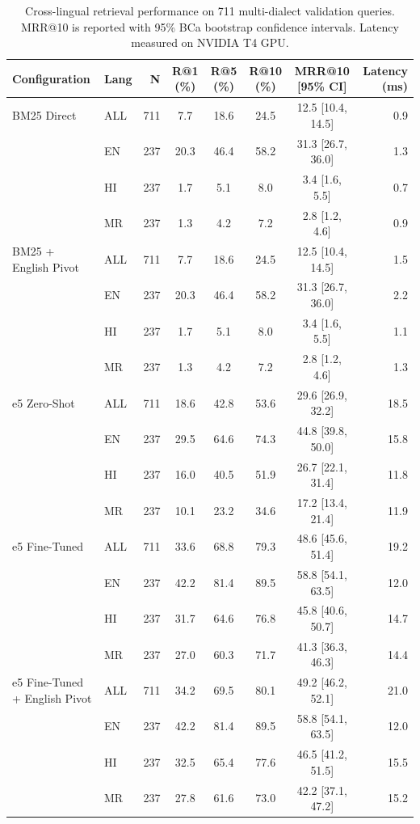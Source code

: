 \begin{table}[t]
\centering
\caption{Cross-lingual retrieval performance on 711 multi-dialect validation queries. MRR@10 is reported with 95\% BCa bootstrap confidence intervals. Latency measured on NVIDIA T4 GPU.}
\label{tab:retrieval_benchmark}
\small
\begin{tabular}{llrccccr}
\toprule
\textbf{Configuration} & \textbf{Lang} & \textbf{N} & \textbf{R@1 (\%)} & \textbf{R@5 (\%)} & \textbf{R@10 (\%)} & \textbf{MRR@10 [95\% CI]} & \textbf{Latency (ms)} \\
\midrule
BM25 Direct & ALL & 711 & 7.7 & 18.6 & 24.5 & 12.5 [10.4, 14.5] & 0.9 \\
 & EN & 237 & 20.3 & 46.4 & 58.2 & 31.3 [26.7, 36.0] & 1.3 \\
 & HI & 237 & 1.7 & 5.1 & 8.0 & 3.4 [1.6, 5.5] & 0.7 \\
 & MR & 237 & 1.3 & 4.2 & 7.2 & 2.8 [1.2, 4.6] & 0.9 \\
\midrule
BM25 + English Pivot & ALL & 711 & 7.7 & 18.6 & 24.5 & 12.5 [10.4, 14.5] & 1.5 \\
 & EN & 237 & 20.3 & 46.4 & 58.2 & 31.3 [26.7, 36.0] & 2.2 \\
 & HI & 237 & 1.7 & 5.1 & 8.0 & 3.4 [1.6, 5.5] & 1.1 \\
 & MR & 237 & 1.3 & 4.2 & 7.2 & 2.8 [1.2, 4.6] & 1.3 \\
\midrule
e5 Zero-Shot & ALL & 711 & 18.6 & 42.8 & 53.6 & 29.6 [26.9, 32.2] & 18.5 \\
 & EN & 237 & 29.5 & 64.6 & 74.3 & 44.8 [39.8, 50.0] & 15.8 \\
 & HI & 237 & 16.0 & 40.5 & 51.9 & 26.7 [22.1, 31.4] & 11.8 \\
 & MR & 237 & 10.1 & 23.2 & 34.6 & 17.2 [13.4, 21.4] & 11.9 \\
\midrule
e5 Fine-Tuned & ALL & 711 & 33.6 & 68.8 & 79.3 & 48.6 [45.6, 51.4] & 19.2 \\
 & EN & 237 & 42.2 & 81.4 & 89.5 & 58.8 [54.1, 63.5] & 12.0 \\
 & HI & 237 & 31.7 & 64.6 & 76.8 & 45.8 [40.6, 50.7] & 14.7 \\
 & MR & 237 & 27.0 & 60.3 & 71.7 & 41.3 [36.3, 46.3] & 14.4 \\
\midrule
e5 Fine-Tuned + English Pivot & ALL & 711 & 34.2 & 69.5 & 80.1 & 49.2 [46.2, 52.1] & 21.0 \\
 & EN & 237 & 42.2 & 81.4 & 89.5 & 58.8 [54.1, 63.5] & 12.0 \\
 & HI & 237 & 32.5 & 65.4 & 77.6 & 46.5 [41.2, 51.5] & 15.5 \\
 & MR & 237 & 27.8 & 61.6 & 73.0 & 42.2 [37.1, 47.2] & 15.2 \\
\bottomrule
\end{tabular}
\end{table}
